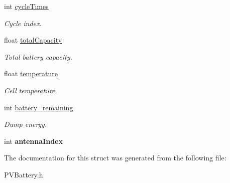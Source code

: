 \begin{DoxyCompactItemize}
\mbox{\label{struct_p_v_battery_status_a0faa77c2b991015bf208a6e4c8a59404}} 
int \hyperlink{struct_p_v_battery_status_a0faa77c2b991015bf208a6e4c8a59404}{cycle\+Times}
\begin{DoxyCompactList}\small\item\em Cycle index. \end{DoxyCompactList}\item 
\mbox{\label{struct_p_v_battery_status_af38dea628764fd8d319d4e23432f2905}} 
float \hyperlink{struct_p_v_battery_status_af38dea628764fd8d319d4e23432f2905}{total\+Capacity}
\begin{DoxyCompactList}\small\item\em Total battery capacity. \end{DoxyCompactList}\item 
\mbox{\label{struct_p_v_battery_status_ab5cd3f246a23f1be1c2f1cfbdb6dd7ef}} 
float \hyperlink{struct_p_v_battery_status_ab5cd3f246a23f1be1c2f1cfbdb6dd7ef}{temperature}
\begin{DoxyCompactList}\small\item\em Cell temperature. \end{DoxyCompactList}\item 
\mbox{\label{struct_p_v_battery_status_a405b48f06a3a15f270f6c7488be6aa2d}} 
int \hyperlink{struct_p_v_battery_status_a405b48f06a3a15f270f6c7488be6aa2d}{battery\+\_\+remaining}
\begin{DoxyCompactList}\small\item\em Dump energy. \end{DoxyCompactList}\item 
\mbox{\label{struct_p_v_battery_status_aa51a70645653a076e0faaf0d1f5544de}} 
int {\bfseries antenna\+Index}
\end{DoxyCompactItemize}


The documentation for this struct was generated from the following file\+:\begin{DoxyCompactItemize}
\item 
P\+V\+Battery.\+h\end{DoxyCompactItemize}
